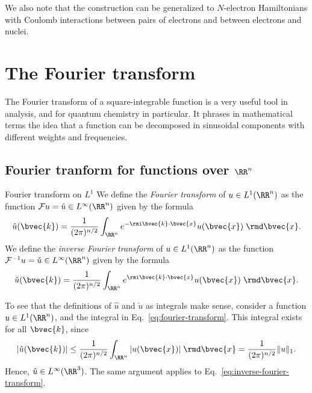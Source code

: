 We also note that the construction can be generalized to $N$-electron Hamiltonians with Coulomb interactions between pairs of electrons and between electrons and nuclei. 

\section{The Fourier transform}

The Fourier transform of a square-integrable function is a very useful tool in analysis, and for quantum chemistry in particular. It phrases in mathematical terms the idea that a function can be decomposed in sinusoidal components with different weights and frequencies.

\subsection{Fourier tranform for functions over $\RR^n$}

\newcommand{\fconst}{\frac{1}{(2\pi)^{n/2}}}

\begin{myDefinition}{Fourier transform on $L^1$}{}
    We define the \emph{Fourier transform} of $u \in L^1(\RR^n)$ as the function $\mathcal{F}u = \hat{u} \in L^\infty(\RR^n)$ given by the formula
    \begin{equation}
        \hat{u}(\bvec{k}) = \fconst \int_{\RR^n} e^{-\rmi \bvec{k}\cdot\bvec{x}} u(\bvec{x})\; \rmd \bvec{x}. \label{eq:fourier-transform}
    \end{equation}    
    We define the \emph{inverse Fourier transform} of $u \in L^1(\RR^n)$ as the function $\mathcal{F}^{-1}u = \check{u} \in L^\infty(\RR^n)$ given by the formula
    \begin{equation}
        \check{u}(\bvec{k}) = \fconst \int_{\RR^n} e^{\rmi \bvec{k}\cdot\bvec{x}} u(\bvec{x})\; \rmd \bvec{x}. \label{eq:inverse-fourier-transform}
    \end{equation}    
\end{myDefinition}
To see that the definitions of $\hat{u}$ and $\check{u}$ as integrals make sense, consider a function $u \in L^1(\RR^n)$, and the integral in Eq.~\eqref{eq:fourier-transform}. This integral exists for all $\bvec{k}$, since
\begin{equation}
    |\hat{u}(\bvec{k})| \leq \fconst \int_{\RR^n} | u(\bvec{x})| \; \rmd\bvec{x} = \fconst \|u\|_1.
\end{equation}
Hence, $\hat{u} \in L^\infty(\RR^3)$. The same argument applies to Eq.~\eqref{eq:inverse-fourier-transform}. 

